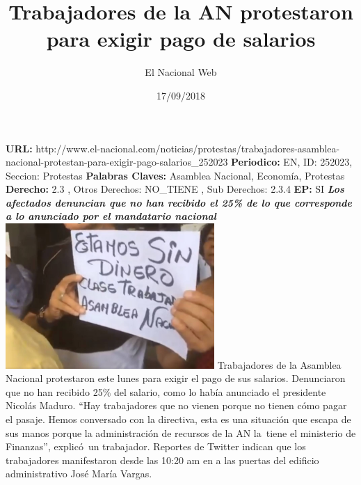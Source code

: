 \documentclass{article}%
\title{\textbf{Trabajadores de la AN protestaron para exigir pago de salarios}}%
\author{El Nacional Web}%
\date{17/09/2018}%
\begin{document}
%
\normalsize%
\maketitle%
\textbf{URL: }%
http://www.el{-}nacional.com/noticias/protestas/trabajadores{-}asamblea{-}nacional{-}protestan{-}para{-}exigir{-}pago{-}salarios\_252023\newline%
%
\textbf{Periodico: }%
EN, %
ID: %
252023, %
Seccion: %
Protestas\newline%
%
\textbf{Palabras Claves: }%
Asamblea Nacional, Economía, Protestas\newline%
%
\textbf{Derecho: }%
2.3%
, Otros Derechos: %
NO\_TIENE%
, Sub Derechos: %
2.3.4%
\newline%
%
\textbf{EP: }%
SI\newline%
\newline%
%
\textbf{\textit{Los afectados denuncian que no han recibido el 25\% de lo que corresponde a lo anunciado por el mandatario nacional}}%
\newline%
\newline%
%
\includegraphics[width=300px]{94.jpg}%
\newline%
%
Trabajadores de la Asamblea Nacional protestaron este lunes para exigir el pago de sus salarios. Denunciaron que no han recibido 25\% del salario, como lo había anunciado el presidente Nicolás Maduro.%
\newline%
%
“Hay trabajadores que no vienen porque no tienen cómo pagar el pasaje. Hemos conversado con la directiva, esta es una situación que escapa de sus manos porque la administración de recursos de la AN la~tiene el ministerio de Finanzas”, explicó~un trabajador.%
\newline%
%
Reportes de Twitter indican que los trabajadores manifestaron desde las 10:20 am en a las puertas del edificio administrativo José María Vargas.%
\newline%
%
\end{document}
